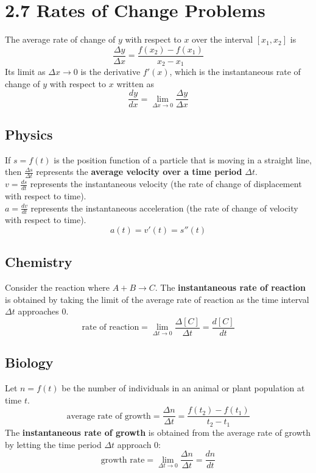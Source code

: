 %
%

\section*{2.7 Rates of Change Problems}

The average rate of change of \(y\) with respect to \(x\) over the interval \([x_1, x_2]\) is
$$ \frac{\Delta y}{\Delta x} = \frac{f(x_2)-f(x_1)}{x_2-x_1} $$
Its limit as \(\Delta x \to 0\) is the derivative \(f'(x)\), which is the instantaneous rate of change of \(y\) with respect to \(x\) written as
$$ \frac{dy}{dx} = \lim_{\Delta x \to 0}\frac{\Delta y}{\Delta x} $$

\subsection*{Physics}

If \(s = f(t)\) is the position function of a particle that is moving in a straight line, then \(\frac{\Delta s}{\Delta t}\) represents the \textbf{average velocity over a time period} \(\Delta t\).\\
\(v=\frac{ds}{dt}\) represents the instantaneous velocity (the rate of change of displacement with respect to time).\\
\(a=\frac{dv}{dt}\) represents the instantaneous acceleration (the rate of change of velocity with respect to time).
$$ a(t)=v'(t)=s''(t) $$

\subsection*{Chemistry}

Consider the reaction where \(A + B \to C\). The \textbf{instantaneous rate of reaction} is obtained by taking the limit of the average rate of reaction as the time interval \(\Delta t\) approaches 0.
$$ \text{rate of reaction} = \lim_{\Delta t \to 0}\frac{\Delta [C]}{\Delta t} = \frac{d[C]}{dt} $$

\subsection*{Biology}

Let \(n=f(t)\) be the number of individuals in an animal or plant population at time \(t\).
$$ \text{average rate of growth} = \frac{\Delta n}{\Delta t} = \frac{f(t_2)-f(t_1)}{t_2-t_1} $$
The \textbf{instantaneous rate of growth} is obtained from the average rate of growth by letting the time period \(\Delta t\) approach 0:
$$ \text{growth rate} = \lim_{\Delta t \to 0}\frac{\Delta n}{\Delta t} = \frac{dn}{dt} $$
